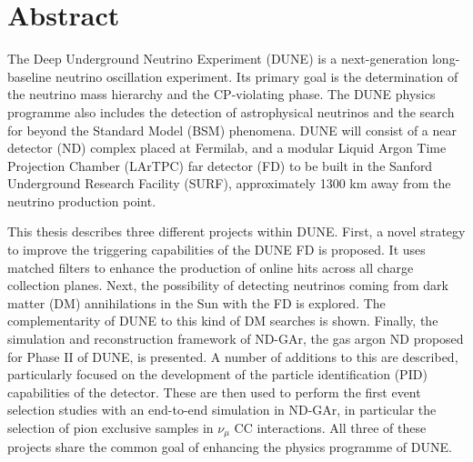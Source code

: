 \chapter*{Abstract}
\label{C:Abstract}

The Deep Underground Neutrino Experiment (DUNE) is a next-generation long-baseline neutrino oscillation experiment. Its primary goal is the determination of the neutrino mass hierarchy and the CP-violating phase. The DUNE physics programme also includes the detection of astrophysical neutrinos and the search for beyond the Standard Model (BSM) phenomena. DUNE will consist of a near detector (ND) complex placed at Fermilab, and a modular Liquid Argon Time Projection Chamber (LArTPC) far detector (FD) to be built in the Sanford Underground Research Facility (SURF), approximately 1300 km away from the neutrino production point.

This thesis describes three different projects within DUNE. First, a novel strategy to improve the triggering capabilities of the DUNE FD is proposed. It uses matched filters to enhance the production of online hits across all charge collection planes. Next, the possibility of detecting neutrinos coming from dark matter (DM) annihilations in the Sun with the FD is explored. The complementarity of DUNE to this kind of DM searches is shown. Finally, the simulation and reconstruction framework of ND-GAr, the gas argon ND proposed for Phase II of DUNE, is presented. A number of additions to this are described, particularly focused on the development of the particle identification (PID) capabilities of the detector. These are then used to perform the first event selection studies with an end-to-end simulation in ND-GAr, in particular the selection of pion exclusive samples in $\nu_{\mu}$ CC interactions. All three of these projects share the common goal of enhancing the physics programme of DUNE.
